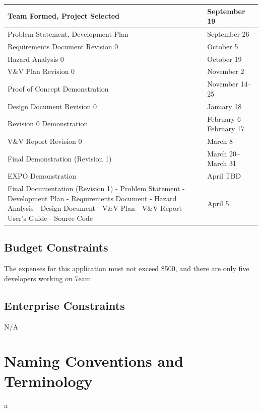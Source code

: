 \documentclass[12pt]{article}
\begin{document}
\begin{tabular}{ |p{9.7cm} l|}
	\hline
	Team Formed, Project Selected & September 19\\
	\hline
	Problem Statement, Development Plan & September 26\\
	\hline
	Requirements Document Revision 0 & October 5\\
	\hline
	Hazard Analysis 0 & October 19\\
	\hline
	V\&V Plan Revision 0 & November 2\\
	\hline
	Proof of Concept Demonstration & November 14--25\\
	\hline
	Design Document Revision 0 & January 18\\
	\hline
	Revision 0 Demonstration & February 6--February 17\\
	\hline
	V\&V Report Revision 0 & March 8\\
	\hline
	Final Demonstration (Revision 1) & March 20--March 31\\
	\hline
	EXPO Demonstration & April TBD\\
	\hline
	Final Documentation (Revision 1)\newline 
	- Problem Statement\newline
	- Development Plan\newline
	- Requirements Document\newline
	- Hazard Analysis\newline
	- Design Document\newline
	- V\&V Plan\newline
	- V\&V Report\newline
	- User's Guide\newline
	- Source Code\newline & April 5\\
	\hline
\end{tabular}

\subsection{Budget Constraints}
The expenses for this application must not exceed \$500, and there are only five developers working on 7eam.

\subsection{Enterprise Constraints}
N/A

\section{Naming Conventions and Terminology}
a
\end{document}
